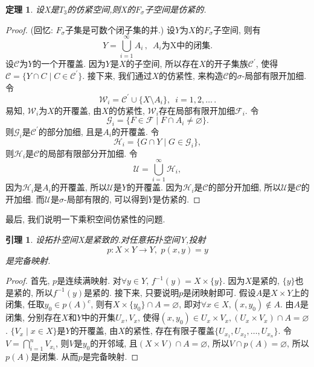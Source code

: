\documentclass[a4paper,UTF8]{ctexart}
\newtheorem{thm}[theorem]{定理} %
\newtheorem{lemma}[theorem]{引理}
\begin{document}
\begin{thm}
  设X是$T_3$的仿紧空间,则X的$F_{\sigma}$子空间是仿紧的.
\end{thm}
\begin{proof}
  (回忆: $F_{\sigma}$子集是可数个闭子集的并.)
  设$Y$为$X$的$F_\sigma$子空间, 则有
  \[
    Y = \bigcup_{i = 1}^{\infty} A_i\,,\,\,\, A_i\text{为X中的闭集}.
  \]
  设$\mathscr{C}$为$Y$的一个开覆盖. 因为$Y$是$X$的子空间, 
  所以存在$X$的开子集族$\mathscr{C}^{'}$, 使得
  $\mathscr{C} = \{ Y \cap C \mid C \in \mathscr{C}^{'} \}$.
  接下来, 我们通过$X$的仿紧性, 来构造$\mathscr{C}$的$\sigma$-局部有限开加细.
  令
  \[
    \mathscr{W}_i = \mathscr{C}^{'} \cup \{X \setminus A_i\},
    \,\,\, i = 1, 2, \dots\,.
  \]
  易知, $\mathscr{W}_i$为$X$的开覆盖, 由$X$的仿紧性,
  $\mathscr{W}_i$存在局部有限开加细$\mathscr{F}_i$. 令
  \[
    \mathscr{G}_i = \{ F \in \mathscr{F} \mid F \cap A_i \neq \varnothing \}.
  \]
  则$\mathscr{G}_i$是$\mathscr{C}^{'}$的部分加细, 且是$A_i$的开覆盖.
  令
  \[
    \mathscr{H}_i = \{ G \cap Y \mid G \in \mathscr{G}_i \}, 
  \]
  则$\mathscr{H}_i$是$\mathscr{C}$的局部有限部分开加细. 令
  \[
    \mathscr{U} = \bigcup_{i = 1}^{\infty} \mathscr{H}_i ,
  \]
  因为$\mathscr{H}_i$是$A_i$的开覆盖, 所以$\mathscr{U}$是$Y$的开覆盖.
  因为$\mathscr{H}_i$是$\mathscr{C}$的部分开加细,
  所以$\mathscr{U}$是$\mathscr{C}$的开加细.
  而$\mathscr{U}$是$\sigma$-局部有限的, 可以得到$Y$是仿紧的.
\end{proof}

最后, 我们说明一下乘积空间仿紧性的问题.

\begin{lemma} \label{lemma:projection}
  设拓扑空间X是紧致的.对任意拓扑空间Y,投射
  \[
    p : X \times Y \longrightarrow Y,\,\, p(x, y) = y
  \]
  是完备映射.
\end{lemma}
\begin{proof}
  首先, $p$是连续满映射. 对$\forall y \in Y$,
  $f^{-1}(y) = X \times \{y\}$. 因为$X$是紧的, $\{y\}$也是紧的,
  所以$f^{-1}(y)$是紧的. 接下来, 只要说明$p$是闭映射即可.
  假设$A$是$X \times Y$上的闭集, 任取$y_0 \in p(A)^{c}$,
  则有$X \times \{ y_0 \} \cap A = \varnothing$, 
  即对$\forall x \in X, (x, y_0) \notin A$.
  由$A$是闭集, 分别存在$X$和$Y$中的开集$U_x, V_x$,
  使得$(x, y_0) \in U_x \times V_x, (U_x \times V_x) \cap A = \varnothing$.
  $\{ V_x \mid x \in X \}$是$Y$的开覆盖, 由$X$的紧性,
  存在有限子覆盖$\{ U_{x_1}, U_{x_2}, \dots, U_{x_n} \}$.
  令$V = \bigcap_{i = 1}^{n} V_{x_i}$, 则$V$是$y_0$的开邻域,
  且$(X \times V) \cap A = \varnothing$,
  所以$V \cap p(A) = \varnothing$, 所以$p(A)$是闭集.
  从而$p$是完备映射.
\end{proof}
\end{document}
